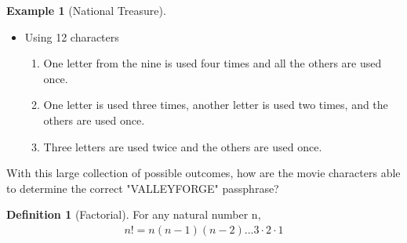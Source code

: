 \documentclass[10pt,]{book}
\theoremstyle{plain}
\theoremstyle{definition}
\newtheorem{definition}[theorem]{Definition}
\theoremstyle{definition}
\newtheorem{example}[theorem]{Example}
\numberwithin{equation}{section}
\begin{document}
\begin{example}[National Treasure]
\begin{itemize}[label=\textbullet]
\item{}Using 12 characters%
%
\begin{enumerate}
\item\hypertarget{li-82}{}One letter from the nine is used four times and all the others are used once.%
\item\hypertarget{li-83}{}One letter is used three times, another letter is used two times, and the others are used once.%
\item\hypertarget{li-84}{}Three letters are used twice and the others are used once.%
\end{enumerate}
\end{itemize}

\par
With this large collection of possible outcomes, how are the movie
		characters able to determine the correct "VALLEYFORGE" passphrase?%
\end{example}
\begin{definition}[Factorial]\label{definition-2}
For any natural number n, 
		\begin{gather*}
n! = n(n-1)(n-2) ... 3 \cdot 2 \cdot 1
\end{gather*}
\end{definition}
\typeout{************************************************}
\typeout{************************************************}
\end{document}
